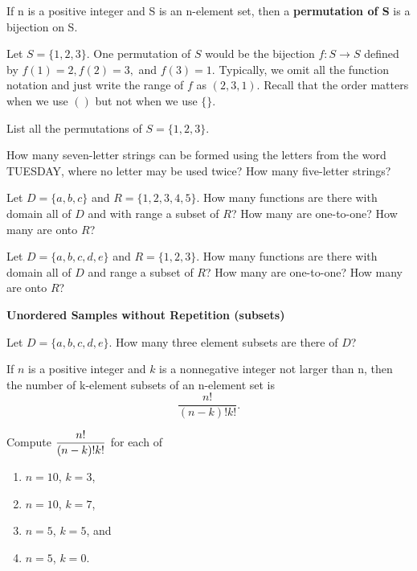 \begin{dfn}
If n is a positive integer and S is an n-element set, then a \textbf{permutation of S} is a bijection on S.
\end{dfn}

\begin{expl}
Let $S = \{1, 2, 3\}$.  One permutation of $S$ would be the bijection $f : S \to S$ defined by $f(1) = 2, f(2) = 3,$ and $f(3)=1$.  Typically, we omit all the function notation and just write the range of $f$ as $(2,3,1)$.   Recall that the order matters when we use $()$ but not when we use $\{\}$.
\end{expl}

\begin{prb}
List all the permutations of\/ $S=\{1,2,3\}$.
\end{prb}

\begin{prb}
How many seven-letter strings can be formed using the letters from the word TUESDAY, where no letter may be used twice? How many five-letter strings?
\end{prb}

\begin{prb}
Let $D=\{a,b,c\}$ and $R=\{1,2,3,4,5\}$.  How many functions are there with domain all of $D$ and with range a subset of $R$?  How many are one-to-one?  How many are onto $R$?
\end{prb}

\begin{prb}
Let $D=\{a,b,c,d,e\}$ and $R=\{1,2,3\}$.  How many functions are there with domain all of $D$ and range a subset of $R$?  How many are one-to-one?  How many are onto $R$?
\end{prb}

\noindent
\textbf{Unordered Samples without Repetition (subsets)}

\begin{prb}
Let $D=\{a,b,c,d,e\}$.  How many three element subsets are there of $D$?
\end{prb}

\begin{thm}
If $n$ is a positive integer and $k$ is a nonnegative integer not larger than n, then the number of k-element subsets of an n-element set is $$\frac{n!}{(n-k)!k!}.$$
\end{thm}


\begin{prb}
Compute  $\displaystyle{\frac{n!}{(n-k)!k!}}$ for each of
\begin{enumerate}
\item $n=10$, $k=3$,
\item $n=10$, $k=7$,
\item $n=5$, $k=5$, and
\item $n=5$, $k=0$.
\end{enumerate}
\end{prb}

